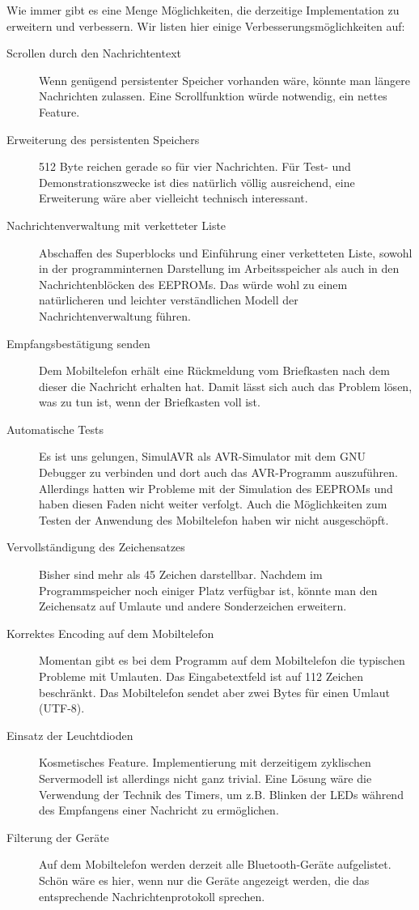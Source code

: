\documentclass[ngerman]{article}
\begin{document}
Wie immer gibt es eine Menge Möglichkeiten, die derzeitige Implementation zu
erweitern und verbessern. Wir listen hier einige Verbesserungsmöglichkeiten
auf:

\begin{description}
    \item[Scrollen durch den Nachrichtentext] Wenn genügend persistenter Speicher vorhanden wäre, könnte man 
        längere Nachrichten zulassen. Eine Scrollfunktion würde notwendig, ein nettes
        Feature.
    \item[Erweiterung des persistenten Speichers] 512 Byte reichen gerade so für vier Nachrichten. Für Test-
        und Demonstrationszwecke ist dies natürlich völlig ausreichend, eine Erweiterung wäre aber vielleicht
        technisch interessant.
    \item[Nachrichtenverwaltung mit verketteter Liste] Abschaffen des Superblocks und Einführung einer verketteten
        Liste, sowohl in der programminternen Darstellung im Arbeitsspeicher als auch in den Nachrichtenblöcken
        des EEPROMs. Das würde wohl zu einem natürlicheren und leichter ver\-ständ\-lichen Modell der 
        Nachrichtenverwaltung führen.
    \item[Empfangsbestätigung senden] Dem Mobiltelefon erhält eine Rückmeldung vom Briefkasten nach dem
        dieser die Nachricht erhalten hat. Damit lässt sich auch das Problem lösen, was zu tun ist, 
        wenn der Briefkasten voll ist.
    \item[Automatische Tests] Es ist uns gelungen, SimulAVR als AVR-Simulator mit dem GNU Debugger
        zu verbinden und dort auch das AVR-Programm auszuführen. Allerdings hatten wir Probleme mit
        der Simulation des EEPROMs und haben diesen Faden nicht weiter verfolgt. Auch die Möglichkeiten
        zum Testen der Anwendung des Mobiltelefon haben wir nicht ausgeschöpft.
    \item[Vervollständigung des Zeichensatzes] Bisher sind mehr als 45 Zeichen darstellbar. Nachdem im
        Programmspeicher noch einiger Platz verfügbar ist, könnte man den Zeichensatz auf Umlaute
        und andere Sonderzeichen erweitern.
    \item[Korrektes Encoding auf dem Mobiltelefon] Momentan gibt es bei dem Programm auf dem Mobiltelefon
        die typischen Probleme mit Umlauten. Das Eingabetextfeld ist auf 112 Zeichen beschränkt. Das
        Mobiltelefon sendet aber zwei Bytes für einen Umlaut (UTF-8).
    \item[Einsatz der Leuchtdioden] Kosmetisches Feature. Implementierung mit derzeitigem zyklischen Servermodell
        ist allerdings nicht ganz trivial. Eine Lösung wäre die Verwendung der Technik des Timers, um z.B.
        Blinken der LEDs während des Empfangens einer Nachricht zu ermöglichen.
    \item[Filterung der Geräte] Auf dem Mobiltelefon werden derzeit alle Bluetooth-Geräte aufgelistet. Schön
        wäre es hier, wenn nur die Geräte angezeigt werden, die das entsprechende Nachrichtenprotokoll
	sprechen.
\end{description}
\end{document}
